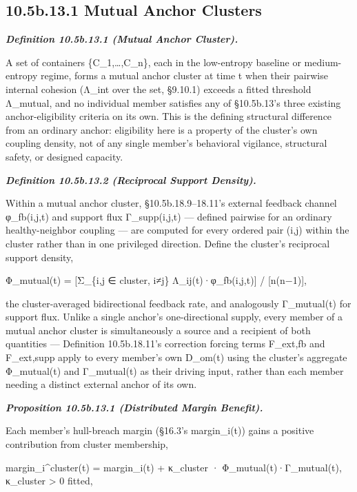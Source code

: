 \documentclass[
]{article}
\begin{document}
\hypertarget{b.13.1-mutual-anchor-clusters}{%
\subsection{10.5b.13.1 Mutual Anchor
Clusters}\label{b.13.1-mutual-anchor-clusters}}

\emph{\textbf{Definition 10.5b.13.1 (Mutual Anchor Cluster).}}

A set of containers \{C\_1,\ldots,C\_n\}, each in the low-entropy
baseline or medium-entropy regime, forms a mutual anchor cluster at time
t when their pairwise internal cohesion (Λ\_int over the set, §9.10.1)
exceeds a fitted threshold Λ\_mutual, and no individual member satisfies
any of §10.5b.13's three existing anchor-eligibility criteria on its
own. This is the defining structural difference from an ordinary anchor:
eligibility here is a property of the cluster's own coupling density,
not of any single member's behavioral vigilance, structural safety, or
designed capacity.

\emph{\textbf{Definition 10.5b.13.2 (Reciprocal Support Density).}}

Within a mutual anchor cluster, §10.5b.18.9--18.11's external feedback
channel φ\_fb(i,j,t) and support flux Γ\_supp(i,j,t) --- defined
pairwise for an ordinary healthy-neighbor coupling --- are computed for
every ordered pair (i,j) within the cluster rather than in one
privileged direction. Define the cluster's reciprocal support density,

Φ\_mutual(t) = {[}Σ\_\{i,j ∈ cluster, i≠j\} Λ\_ij(t)·φ\_fb(i,j,t){]} /
{[}n(n−1){]},

the cluster-averaged bidirectional feedback rate, and analogously
Γ\_mutual(t) for support flux. Unlike a single anchor's one-directional
supply, every member of a mutual anchor cluster is simultaneously a
source and a recipient of both quantities --- Definition 10.5b.18.11's
correction forcing terms F\_ext,fb and F\_ext,supp apply to every
member's own D\_om(t) using the cluster's aggregate Φ\_mutual(t) and
Γ\_mutual(t) as their driving input, rather than each member needing a
distinct external anchor of its own.

\emph{\textbf{Proposition 10.5b.13.1 (Distributed Margin Benefit).}}

Each member's hull-breach margin (§16.3's margin\_i(t)) gains a positive
contribution from cluster membership,

margin\_i\^{}cluster(t) = margin\_i(t) + κ\_cluster ·
Φ\_mutual(t)·Γ\_mutual(t), κ\_cluster \textgreater{} 0 fitted,
\end{document}
